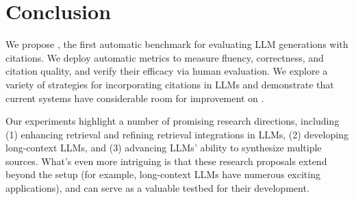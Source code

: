 
\section{Conclusion}

We propose \citeeval{}, the first automatic benchmark for evaluating LLM generations with citations.
We deploy automatic metrics to measure fluency, correctness, and citation quality, and verify their efficacy via human evaluation.
We explore a variety of strategies for incorporating citations in LLMs
and demonstrate that current systems have considerable room for improvement on \citeeval{}.

Our experiments highlight a number of promising research directions, including
(1) enhancing retrieval and refining retrieval integrations in LLMs,
(2) developing long-context LLMs, and 
(3) advancing LLMs' ability to synthesize multiple sources.
What's even more intriguing is that  these research proposals extend beyond the \citeeval{} setup (for example, long-context LLMs have numerous exciting applications), and
\citeeval{} can serve as a valuable testbed for their development.